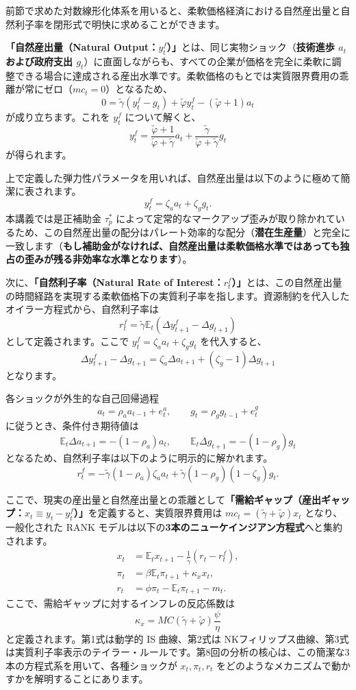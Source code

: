 \documentclass[
  japanese,
  lualatex,
  ja=standard,
  12pt,
  a4paper]{ltjsarticle}
\begin{document}
前節で求めた対数線形化体系を用いると、柔軟価格経済における自然産出量と自然利子率を閉形式で明快に求めることができます。

\textbf{「自然産出量（Natural
Output：\(y_t^f\)）」}とは、同じ実物ショック（\textbf{技術進歩 \(a_t\)
および政府支出
\(g_t\)}）に直面しながらも、すべての企業が価格を完全に柔軟に調整できる場合に達成される産出水準です。柔軟価格のもとでは実質限界費用の乖離が常にゼロ（\(mc_t=0\)）となるため、
\[
0
=
\tilde{\gamma}(y_t^f-g_t)
+\tilde{\varphi}y_t^f
-(\tilde{\varphi}+1)a_t
\] が成り立ちます。これを \(y_t^f\) について解くと、 \[
y_t^f
=
\frac{\tilde{\varphi}+1}{\tilde{\varphi}+\tilde{\gamma}}a_t
+
\frac{\tilde{\gamma}}{\tilde{\varphi}+\tilde{\gamma}}g_t
\] が得られます。

\Needspace{0.18\textheight}

上で定義した弾力性パラメータを用いれば、自然産出量は以下のように極めて簡潔に表されます。
\[
y_t^f=\zeta_a a_t+\zeta_g g_t.
\] 本講義では是正補助金 \(\tau_p^*\)
によって定常的なマークアップ歪みが取り除かれているため、この自然産出量の配分はパレート効率的な配分（\textbf{潜在生産量}）と完全に一致します（\textbf{もし補助金がなければ、自然産出量は柔軟価格水準ではあっても独占の歪みが残る非効率な水準となります}）。

次に、\textbf{「自然利子率（Natural Rate of
Interest：\(r_t^f\)）」}とは、この自然産出量の時間経路を実現する柔軟価格下の実質利子率を指します。資源制約を代入したオイラー方程式から、自然利子率は
\[
r_t^f
=
\tilde{\gamma}\mathbb{E}_t(\Delta y_{t+1}^f-\Delta g_{t+1})
\] として定義されます。ここで \(y_t^f=\zeta_a a_t+\zeta_g g_t\)
を代入すると、 \[
\Delta y_{t+1}^f-\Delta g_{t+1}
=
\zeta_a\Delta a_{t+1}
+(\zeta_g-1)\Delta g_{t+1}
\] となります。

\Needspace{0.26\textheight}

各ショックが外生的な自己回帰過程 \[
a_t=\rho_a a_{t-1}+e_t^a,
\qquad
g_t=\rho_g g_{t-1}+e_t^g
\] に従うとき、条件付き期待値は \[
\mathbb{E}_t\Delta a_{t+1}=-(1-\rho_a)a_t,
\qquad
\mathbb{E}_t\Delta g_{t+1}=-(1-\rho_g)g_t
\] となるため、自然利子率は以下のように明示的に解かれます。 \[
r_t^f
=
-\tilde{\gamma}(1-\rho_a)\zeta_a a_t
+\tilde{\gamma}(1-\rho_g)(1-\zeta_g)g_t.
\]

\Needspace{0.32\textheight}

ここで、現実の産出量と自然産出量との乖離として\textbf{「需給ギャップ（産出ギャップ：\(x_t \equiv y_t - y_t^f\)）」}を定義すると、実質限界費用は
\(mc_t = (\tilde{\gamma}+\tilde{\varphi})x_t\) となり、一般化された RANK
モデルは以下の\textbf{3本のニューケインジアン方程式}へと集約されます。
\[
\begin{aligned}
x_t
&=
\mathbb{E}_t x_{t+1}
-\frac{1}{\tilde{\gamma}}(r_t-r_t^f),\\
\pi_t
&=
\beta\mathbb{E}_t\pi_{t+1}
+\kappa_x x_t,\\
r_t
&=
\phi\pi_t-\mathbb{E}_t\pi_{t+1}-m_t.
\end{aligned}
\] ここで、需給ギャップに対するインフレの反応係数は \[
\kappa_x
=
MC(\tilde{\gamma}+\tilde{\varphi})\frac{\psi}{\eta}
\] と定義されます。第1式は動学的 IS 曲線、第2式は
NKフィリップス曲線、第3式は実質利子率表示のテイラー・ルールです。第8回の分析の核心は、この簡潔な3本の方程式系を用いて、各種ショックが
\(x_t, \pi_t, r_t\)
をどのようなメカニズムで動かすかを解明することにあります。
\end{document}
